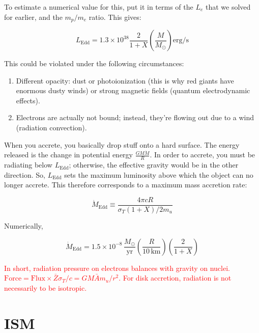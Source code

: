 \documentclass[12pt, letterpaper, preprint]{aastex}
\newcommand{\ledd}{L_{\mathrm{Edd}}}
\newcommand{\medd}{\dot{M}_{\mathrm{Edd}}}
\begin{document}
\begin{enumerate}
To estimate a numerical value for this, put it in terms of the $L_e$ that we solved for earlier, and the $m_p/m_e$ ratio. This gives:

$$ \ledd = 1.3 \times 10^{38} \frac{2}{1+X} \left( \frac{M}{M_\odot} \right) \mathrm{erg/s} $$

This could be violated under the following circumstances:

\begin{enumerate}
\item Different opacity: dust or photoionization (this is why red giants have enormous dusty winds) or strong magnetic fields (quantum electrodynamic effects).
\item Electrons are actually not bound; instead, they're flowing out due to a wind (radiation convection).
\end{enumerate}

When you accrete, you basically drop stuff onto a hard surface. The energy released is the change in potential energy $ \frac{G M \dot{M} }{R} $. In order to accrete, you must be radiating below $\ledd$; otherwise, the effective gravity would be in the other direction. So, $\ledd$ sets the maximum luminosity above which the object can no longer accrete. This therefore corresponds to a maximum mass accretion rate:

\begin{equation}
\medd \equiv \frac{4 \pi c R}{\sigma_T (1 + X) / 2 m_u}
\end{equation}

Numerically,

$$ \medd = 1.5 \times 10^{-8} \, \frac{M_\odot}{\mathrm{yr}} \left( \frac{R}{10\,\mathrm{km}} \right) \left( \frac{2}{1+X} \right) $$

\textcolor{red}{In short, radiation pressure on electrons balances with gravity on nuclei. $\mathrm{Force}=\mathrm{Flux} \times \bar{Z}\sigma_{T}/c=GM \bar{A}m_u/r^2$. For disk accretion, radiation is not necessarily to be isotropic. }

\end{enumerate}

\section*{ISM}
\end{document}
